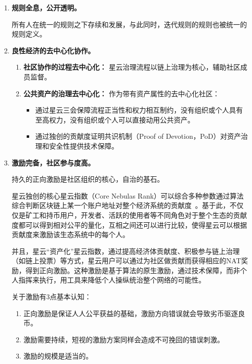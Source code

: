 \begin{enumerate}
	\item 

	\textbf{规则全息，公开透明。} 

	所有人在统一的规则之下存续和发展，与此同时，迭代规则的规则也被统一的规则定义。


	\item 

	\textbf{良性经济的去中心化协作。}

	\begin{enumerate}
		\item 

		\textbf{社区协作的过程去中心化：} 星云治理流程以链上治理为核心，辅助社区成员监督。
	
		\item 

		\textbf{公共资产的治理去中心化：} 作为带有资产属性的去中心化社区：

		\begin{itemize}
			\item 通过星云三会保障流程正当性和权力相互制约，没有组织或个人具有至高权力，没有组织或个人可以直接动用公共资产。
			\item 通过独创的贡献度证明共识机制（Proof of Devotion，PoD）对资产治理和安全性提供技术保障。
		\end{itemize}

	\end{enumerate}

	\item 

	\textbf{激励完备，社区参与度高。}
	
	持久的正向激励是社区组织的核心，自治的基石。

	星云独创的核心星云指数（Core Nebulas Rank）可以综合多种参数通过算法综合判断区块链上某一个账户地址对整个经济系统的贡献度~\cite{yellowpaper}。基于此，不仅仅是矿工和持币用户，开发者、活跃的使用者等不同角色对于整个生态的贡献度都可以得到相对公平的量化，互相之间还可以进行比较，使得星云可以根据贡献度来激励该生态系统中的每个人。

	并且，星云“资产化”星云指数，通过提高经济体贡献度、积极参与链上治理（如链上投票）等方式，星云用户可以通过为社区做贡献而获得相应的NAT奖励，得到正向激励。这种激励是基于算法的原生激励，通过技术保障，而非个人指挥来执行，用工具来降低个人操纵统治整个网络的可能性。

	关于激励有3点基本认知：

	\begin{enumerate}
		\item 正向激励是保证人人公平获益的基础，激励方向错误就会导致劣币驱逐良币。
		\item 激励需要持续，短视的激励方案同样会造成不可挽回的错误刺激。
		\item 激励的规模是适当的。
	\end{enumerate}


\end{enumerate}

